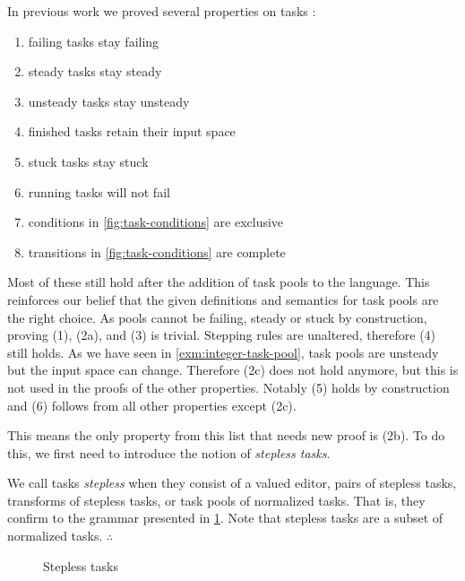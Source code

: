 In previous work we proved several properties on tasks \cite{conf/sfp/KlijnsmaS22,Steenvoorden22}:
\begin{enumerate}
  \item[(1)] failing tasks stay failing
  \item[(2a)] steady tasks stay steady
  \item[(2b)] unsteady tasks stay unsteady
  \item[(2c)] finished tasks retain their input space
  \item[(3)] stuck tasks stay stuck
  \item[(4)] running tasks will not fail
  \item[(5)] conditions in \cref{fig:task-conditions} are exclusive
  \item[(6)] transitions in \cref{fig:task-conditions} are complete
\end{enumerate}
Most of these still hold after the addition of task pools to the language.
This reinforces our belief that the given definitions and semantics for task pools are the right choice.
As pools cannot be failing, steady or stuck by construction,
proving (1), (2a), and (3) is trivial.
Stepping rules are unaltered, therefore (4) still holds.
As we have seen in \cref{exm:integer-task-pool},
task pools are unsteady but the input space can change.
Therefore (2c) does not hold anymore,
but this is not used in the proofs of the other properties.
Notably (5) holds by construction and (6) follows from all other properties except (2c).

This means the only property from this list that needs new proof is (2b).
To do this, we first need to introduce the notion of \emph{stepless tasks}.

\begin{definition}
  \label{def:stepless-task}
  We call tasks \emph{stepless} when they consist of
  a valued editor,
  pairs of stepless tasks,
  transforms of stepless tasks,
  or task pools of normalized tasks.
  That is, they confirm to the grammar presented in \cref{fig:stepless-tasks-grammar}.
  Note that stepless tasks are a subset of normalized tasks.
\hfill$\therefore$\end{definition}

\begin{figure}
  \GSteplessTaskscompact
  \caption{Stepless tasks}
  \label{fig:stepless-tasks-grammar}
\end{figure}

